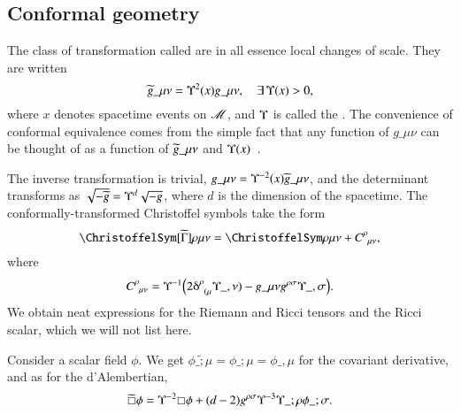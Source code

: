 \subsection{Conformal geometry}\label{sec:GR:diffgeo:conformal}
    The class of transformation called  are in all essence local changes of scale. They are written
    \begin{equation}\label{eq:GR:diffgeo:conformal_trafo}
        \widetilde{g}\_{\mu\nu} = \Upsilon^2(x) g\_{\mu\nu} , \quad \exists\, \Upsilon(x) > 0,
    \end{equation}
    where $x$ denotes spacetime events on $\mathscr{M}$, and $\Upsilon$ is called the . The convenience of conformal equivalence comes from the simple fact that any function of $g\_{\mu\nu}$ can be thought of as a function of $\widetilde{g}\_{\mu\nu}$ and $\Upsilon(x)$~\citep{carrollSpacetimeGeometryIntroduction2019}. 



    The inverse transformation is trivial, $g\_{\mu\nu} = \Upsilon^{-2}(x)\widetilde{g}\_{\mu\nu}$, and the determinant transforms as $\sqrt{-\widetilde{g}}= \Upsilon^d \sqrt{-g}$, where $d$ is the dimension of the spacetime. The conformally-transformed Christoffel symbols take the form
    \begin{equation}
        \Chr[\wt{\Gamma}]{\rho}{\mu\nu} = \Chr{\rho}{\mu\nu}  + C\indices{^\rho_{\mu\nu}},
    \end{equation}
    where 
    \begin{equation}
        C\indices{^\rho_{\mu\nu}} = \cfac^{-1} 
        \pclosed{ 2\Krondelta{^\rho_{(\mu}} \cfac\_{,\nu)}  - g\_{\mu\nu} g\^{\rho\sigma} \cfac\_{,\sigma} }.
    \end{equation}
    We obtain neat expressions for the Riemann and Ricci tensors and the Ricci scalar, which we will not list here.%

    Consider a scalar field $\phi$. We get  $\phi\_{\tilde{;}\mu}= \phi\_{;\mu} = \phi\_{,\mu}$ %
    for the covariant derivative, and as for the d'Alembertian, 
    \begin{equation}
        \wt{\sq} \phi = \cfac^{-2} \sq \phi + (d-2) g\^{\rho \sigma } \cfac^{-3} \cfac\_{;\rho} \phi\_{;\sigma}.
    \end{equation}




